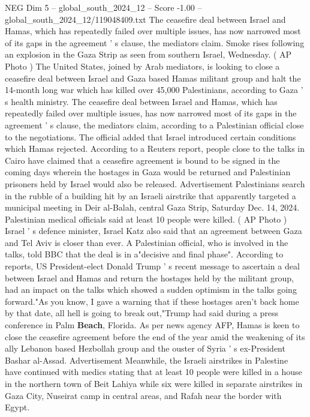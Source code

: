 \begin{textsample}{NEG Dim 5 – global\_south\_2024\_12 – Score -1.00 – global\_south\_2024\_12/119048409.txt}  \label{ex:f5_neg_400}
The ceasefire deal between Israel and Hamas, which has repeatedly failed over multiple issues, has now narrowed most of its gaps in the agreement ' s clause, the mediators claim.
Smoke rises following an explosion in the Gaza Strip as seen from southern Israel, Wednesday. ( AP Photo ) The United States, joined by Arab mediators, is looking to close a ceasefire deal between Israel and Gaza based Hamas militant group and halt the 14-month long war which has killed over 45,000 Palestinians, according to Gaza ' s health ministry.
The ceasefire deal between Israel and Hamas, which has repeatedly failed over multiple issues, has now narrowed most of its gaps in the agreement ' s clause, the mediators claim, according to a Palestinian official close to the negotiations.
The official added that Israel introduced certain conditions which Hamas rejected.
According to a Reuters report, people close to the talks in Cairo have claimed that a ceasefire agreement is bound to be signed in the coming days wherein the hostages in Gaza would be returned and Palestinian prisoners held by Israel would also be released.
Advertisement Palestinians search in the rubble of a building hit by an Israeli airstrike that apparently targeted a municipal meeting in Deir al-Balah, central Gaza Strip, Saturday Dec. 14, 2024.
Palestinian medical officials said at least 10 people were killed. ( AP Photo ) Israel ' s defence minister, Israel Katz also said that an agreement between Gaza and Tel Aviv is closer than ever.
A Palestinian official, who is involved in the talks, told BBC that the deal is in a"decisive and final phase".
According to reports, US President-elect Donald Trump ' s recent message to ascertain a deal between Israel and Hamas and return the hostages held by the militant group, had an impact on the talks which showed a sudden optimism in the talks going forward."As you know, I gave a warning that if these hostages aren't back home by that date, all hell is going to break out,"Trump had said during a press conference in Palm \textbf{Beach}, Florida.
As per news agency AFP, Hamas is keen to close the ceasefire agreement before the end of the year amid the weakening of its ally Lebanon based Hezbollah group and the ouster of Syria ' s ex-President Bashar al-Assad.
Advertisement Meanwhile, the Israeli airstrikes in Palestine have continued with medics stating that at least 10 people were killed in a house in the northern town of Beit Lahiya while six were killed in separate airstrikes in Gaza City, Nuseirat camp in central areas, and Rafah near the border with Egypt.

\end{textsample}
